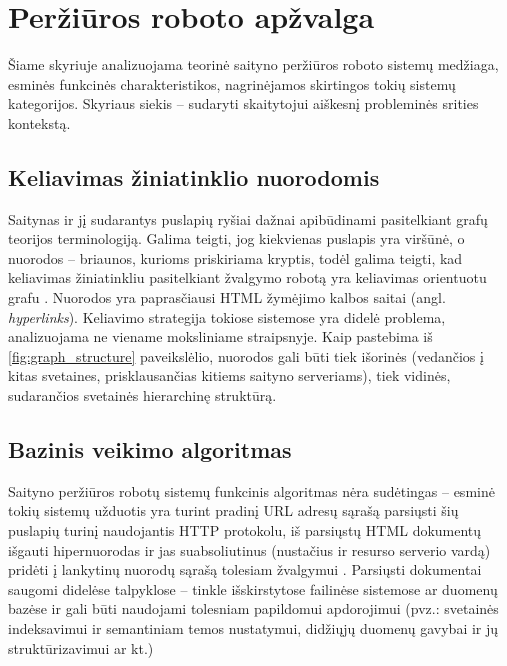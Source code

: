 \section{Peržiūros roboto apžvalga}

Šiame skyriuje analizuojama teorinė saityno peržiūros roboto sistemų medžiaga, esminės funkcinės charakteristikos, nagrinėjamos skirtingos tokių sistemų kategorijos. Skyriaus siekis -- sudaryti skaitytojui aiškesnį probleminės srities kontekstą.

\subsection{Keliavimas žiniatinklio nuorodomis}

Saitynas ir jį sudarantys puslapių ryšiai dažnai apibūdinami pasitelkiant grafų teorijos terminologiją. Galima teigti, jog kiekvienas puslapis yra viršūnė, o nuorodos -- briaunos, kurioms priskiriama kryptis, todėl galima teigti, kad keliavimas žiniatinkliu pasitelkiant žvalgymo robotą yra keliavimas orientuotu grafu \cite{CategoriesOfWebCrawlersAndOverview}. Nuorodos yra paprasčiausi HTML žymėjimo kalbos saitai (angl. \textit{hyperlinks}). Keliavimo strategija tokiose sistemose yra didelė problema, analizuojama ne viename moksliniame straipsnyje. Kaip pastebima iš \ref{fig:graph_structure} paveikslėlio, nuorodos gali būti tiek išorinės (vedančios į kitas svetaines, prisklausančias kitiems saityno serveriams), tiek vidinės, sudarančios svetainės hierarchinę struktūrą.



\subsection{Bazinis veikimo algoritmas}

Saityno peržiūros robotų sistemų funkcinis algoritmas nėra sudėtingas -- esminė tokių sistemų užduotis yra turint pradinį URL adresų sąrašą parsiųsti šių puslapių turinį naudojantis HTTP protokolu, iš parsiųstų HTML dokumentų išgauti hipernuorodas ir jas suabsoliutinus (nustačius ir resurso serverio vardą) pridėti į lankytinų nuorodų sąrašą tolesiam žvalgymui \cite{StanfWebCrawl}. Parsiųsti dokumentai saugomi didelėse talpyklose -- tinkle išskirstytose failinėse sistemose ar duomenų bazėse ir gali būti naudojami tolesniam papildomui apdorojimui (pvz.: svetainės indeksavimui ir semantiniam temos nustatymui, didžiųjų duomenų gavybai ir jų struktūrizavimui ar kt.)

